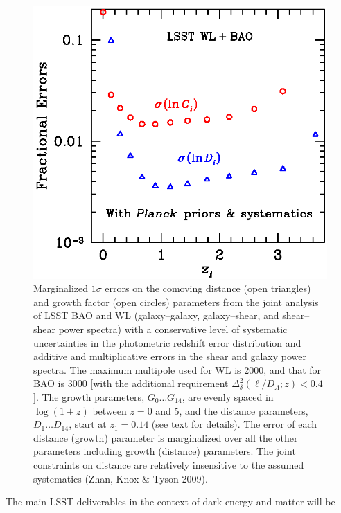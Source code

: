 \documentclass{emulateapj}
\begin{document}
\begin{figure}
\includegraphics[width=1.0\hsize,clip]{dges.ps}
\caption{Marginalized $1\sigma$ errors on the comoving distance 
(open triangles) and growth factor (open circles) parameters from 
the joint analysis of LSST BAO and WL (galaxy--galaxy, galaxy--shear,
and shear--shear power spectra) with a 
conservative level of systematic uncertainties in the photometric redshift error 
distribution and additive and multiplicative errors in the shear and 
galaxy power spectra. The maximum multipole used for WL is 
2000, and that for BAO is 3000 [with the additional requirement
$\Delta_\delta^2(\ell/D_{A};z) < 0.4$].
The growth parameters, $G_0 \ldots G_{14}$, are evenly spaced in 
$\log(1+z)$ between $z = 0$ and 5, and the distance parameters, 
$D_1 \ldots D_{14}$, start at $z_1 = 0.14$ (see text for details).
The error of each distance (growth) parameter is marginalized 
over all the other parameters including growth (distance) parameters. The joint constraints on 
distance are relatively insensitive to the assumed systematics
(Zhan, Knox \& Tyson 2009).} 
\label{Fig:bao2}
\end{figure}


The main LSST deliverables in the context of dark energy and matter will be
\end{document}
